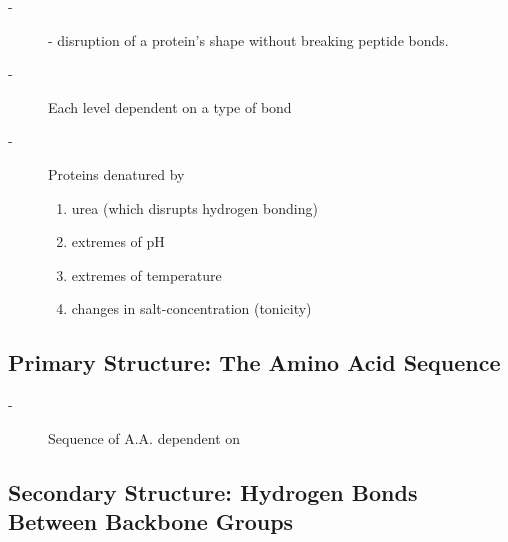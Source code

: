 \documentclass[../Bio_chemistryReview.tex]{subfiles}
\begin{document}
\begin{description}
  \item[-]  - disruption of a protein's shape without breaking peptide bonds.
  \item[-] Each level dependent on a type of bond
  \item[-] Proteins denatured by
    \begin{enumerate}
      \item urea (which disrupts hydrogen bonding)
      \item extremes of pH
      \item extremes of temperature
      \item changes in salt-concentration (tonicity) 
    \end{enumerate}
\end{description}

\subsection{Primary Structure: The Amino Acid Sequence}

\begin{description}
  \item[-] Sequence of A.A. dependent on 
\end{description}

\subsection{Secondary Structure: Hydrogen Bonds Between Backbone Groups}
\end{document}
